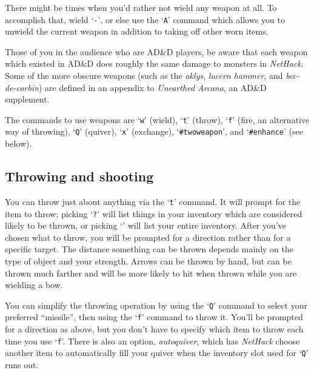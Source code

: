 There might be times when you'd rather not wield any weapon at all.
To accomplish that, wield `{\tt -}', or else use the `{\tt A}' command which
allows you to unwield the current weapon in addition to taking off
other worn items.

Those of you in the audience who are AD\&D players, be aware that each
weapon which existed in AD\&D does roughly the same damage to monsters in
{\it NetHack}.  Some of the more obscure weapons (such as the %
{\it aklys}, {\it lucern hammer}, and {\it bec-de-corbin\/}) are defined
in an appendix to {\it Unearthed Arcana}, an AD\&D supplement.

The commands to use weapons are `{\tt w}' (wield), `{\tt t}' (throw),
`{\tt f}' (fire, an alternative way of throwing), `{\tt Q}' (quiver),
`{\tt x}' (exchange), `{\tt \#twoweapon}', and `{\tt \#enhance}' (see below).

\subsection*{Throwing and shooting}

You can throw just about anything via the `{\tt t}' command.  It will prompt
for the item to throw; picking `{\tt ?}' will list things in your inventory
which are considered likely to be thrown, or picking `{\tt *}' will list
your entire inventory.  After you've chosen what to throw, you will
be prompted for a direction rather than for a specific target.  The
distance something can be thrown depends mainly on the type of object
and your strength.  Arrows can be thrown by hand, but can be thrown
much farther and will be more likely to hit when thrown while you are
wielding a bow.

You can simplify the throwing operation by using the `{\tt Q}' command to
select your preferred ``missile'', then using the `{\tt f}' command to
throw it.  You'll be prompted for a direction as above, but you don't
have to specify which item to throw each time you use `{\tt f}'.  There is
also an option,
{\it autoquiver},
which has {\it NetHack\/} choose another item to automatically fill your
quiver when the inventory slot used for `{\tt Q}' runs out.

